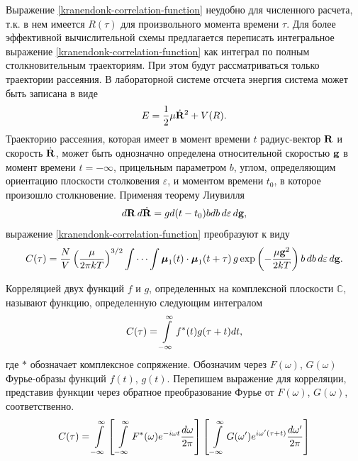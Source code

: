 Выражение \eqref{kranendonk-correlation-function} неудобно для численного расчета, т.к. в нем имеется $R(\tau)$ для произвольного момента времени $\tau$. Для более эффективной вычислительной схемы предлагается переписать интегральное выражение \eqref{kranendonk-correlation-function} как интеграл по полным столкновительным траекториям. При этом будут рассматриваться только траектории рассеяния. В лабораторной системе отсчета энергия система может быть записана в виде
\begin{gather}
    E = \frac{1}{2} \mu \dot{\mathbf{R}}^2 + V(R).
\end{gather}
Траекторию рассеяния, которая имеет в момент времени $t$ радиус-вектор $\mathbf{R}$ и скорость $\dot{\mathbf{R}}$, может быть однозначно определена относительной скоростью $\mathbf{g}$ в момент времени $t = -\infty$, прицельным параметром $b$, углом, определяющим ориентацию плоскости столковения $\varepsilon$, и моментом времени $t_0$, в которое произошло столкновение. Применяя теорему Лиувилля
\begin{gather}
    d \mathbf{R} \, d\dot{\mathbf{R}} = g d(t - t_0) b db \, d\varepsilon \, d\mathbf{g},
\end{gather}
%
выражение \eqref{kranendonk-correlation-function} преобразуют к виду
\begin{gather}
    C(\tau) = \frac{N}{V} \left( \frac{\mu}{2 \pi k T} \right)^{3/2} \idotsint \boldsymbol{\mu}_1(t) \cdot \boldsymbol{\mu}_1(t + \tau) \, g \exp \left( - \frac{\mu \mathbf{g}^2}{2 k T} \right) b \, db \, d\varepsilon \, d \mathbf{g}. \label{correlation-function-kranendonk}
\end{gather}

Корреляцией двух функций $f$ и $g$, определенных на комплексной плоскости $\mathbb{C}$, называют функцию, определенную следующим интегралом
\begin{gather}
    C(\tau) = \int\limits_{-\infty}^\infty f^{*}(t) g(\tau + t) dt,
\end{gather}
% 
где $*$ обозначает комплексное сопряжение. Обозначим через $F(\omega)$, $G(\omega)$ Фурье-образы функций $f(t)$, $g(t)$. Перепишем выражение для корреляции, представив функции через обратное преобразование Фурье от $F(\omega)$, $G(\omega)$, соответственно.
\begin{gather}
    C(\tau) = \int\limits_{-\infty}^\infty \left[ \, \int\limits_{-\infty}^\infty F^{*}(\omega) e^{-i \omega t} \frac{d \omega}{2 \pi} \right] \left[ \, \int\limits_{-\infty}^\infty G(\omega^\prime) e^{i \omega^\prime (\tau + t)} \frac{d\omega^\prime}{2 \pi} \right]
\end{gather}

